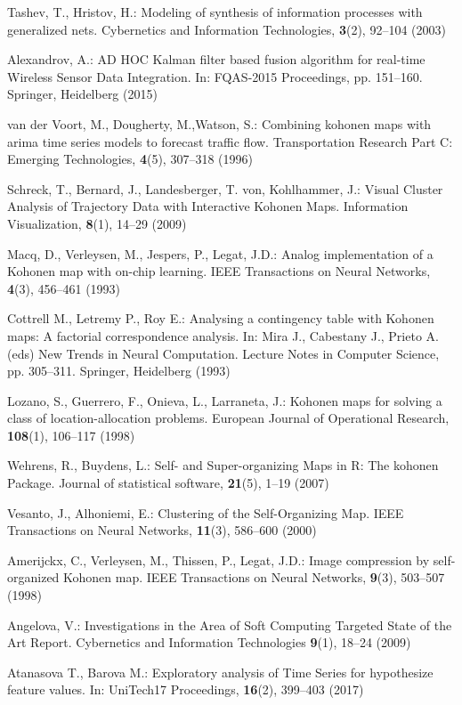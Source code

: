 \documentclass[runningheads]{llncs}
\begin{document}
\begin{thebibliography}{8}

Tashev, T., Hristov, H.: Modeling of synthesis of information processes with generalized nets. Cybernetics and Information Technologies, \textbf{3}(2), 92--104 (2003) 

Alexandrov, A.: AD HOC Kalman filter based fusion algorithm for real-time Wireless Sensor Data Integration. In: FQAS-2015 Proceedings, pp. 151--160. Springer, Heidelberg (2015)

van der Voort, M., Dougherty, M.,Watson, S.: Combining kohonen maps with arima time series models to forecast traffic flow. Transportation Research Part C: Emerging Technologies, \textbf{4}(5), 307--318 (1996) 

Schreck, T., Bernard, J., Landesberger, T. von, Kohlhammer, J.: Visual Cluster Analysis of Trajectory Data with Interactive Kohonen Maps. Information Visualization, \textbf{8}(1), 14--29 (2009)

Macq, D., Verleysen, M., Jespers, P., Legat, J.D.: Analog implementation of a Kohonen map with on-chip learning. IEEE Transactions on Neural Networks, \textbf{4}(3), 456--461 (1993)

Cottrell M., Letremy P., Roy E.: Analysing a contingency table with Kohonen maps: A factorial correspondence analysis. In: Mira J., Cabestany J., Prieto A. (eds) New Trends in Neural Computation. Lecture Notes in Computer Science, pp. 305--311. Springer, Heidelberg (1993)

Lozano, S., Guerrero, F., Onieva, L., Larraneta, J.: Kohonen maps for solving a class of location-allocation problems. European Journal of Operational Research, \textbf{108}(1), 106--117 (1998)

Wehrens, R., Buydens, L.: Self- and Super-organizing Maps in R: The kohonen Package. Journal of statistical software, \textbf{21}(5), 1--19 (2007)

Vesanto, J., Alhoniemi, E.: Clustering of the Self-Organizing Map. IEEE Transactions on Neural Networks, \textbf{11}(3), 586--600 (2000) 

Amerijckx, C., Verleysen, M., Thissen, P., Legat, J.D.: Image compression by self-organized Kohonen map. IEEE Transactions on Neural Networks, \textbf{9}(3), 503--507 (1998)

Angelova, V.: Investigations in the Area of Soft Computing Targeted State of the Art Report. Cybernetics and Information Technologies \textbf{9}(1), 18--24 (2009)

Atanasova T., Barova M.: Exploratory analysis of Time Series for hypothesize feature values. In: UniTech17 Proceedings,  \textbf{16}(2), 399--403 (2017)

\end{thebibliography}
\end{document}
